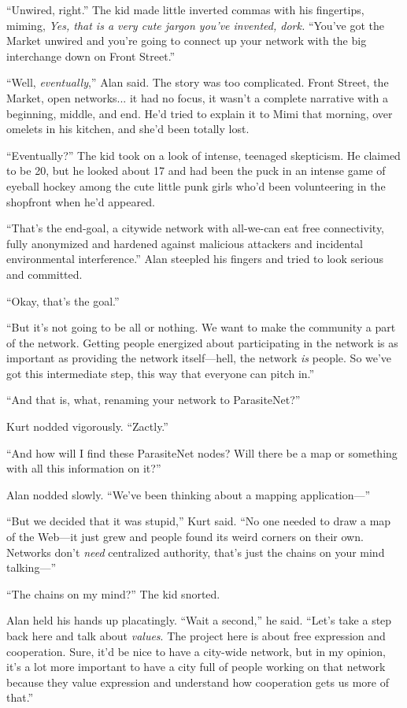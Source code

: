 \documentclass{article}
\begin{document}
``Unwired, right.'' The kid made little inverted commas with his
fingertips, miming, \textit{Yes, that is a very cute jargon you've
invented, dork.} ``You've got the Market unwired and you're going to
connect up your network with the big interchange down on Front
Street.''

``Well, \textit{eventually},'' Alan said.  The story was too
complicated.  Front Street, the Market, open networks...  it had no
focus, it wasn't a complete narrative with a beginning, middle, and
end.  He'd tried to explain it to Mimi that morning, over omelets in
his kitchen, and she'd been totally lost.

``Eventually?'' The kid took on a look of intense, teenaged
skepticism.  He claimed to be 20, but he looked about 17 and had been
the puck in an intense game of eyeball hockey among the cute little
punk girls who'd been volunteering in the shopfront when he'd
appeared.

``That's the end-goal, a citywide network with all-we-can eat free
connectivity, fully anonymized and hardened against malicious
attackers and incidental environmental interference.'' Alan steepled
his fingers and tried to look serious and committed.

``Okay, that's the goal.''

``But it's not going to be all or nothing.  We want to make the
community a part of the network.  Getting people energized about
participating in the network is as important as providing the network
itself---hell, the network \textit{is} people.  So we've got this
intermediate step, this way that everyone can pitch in.''

``And that is, what, renaming your network to ParasiteNet?''

Kurt nodded vigorously.  ``Zactly.''

``And how will I find these ParasiteNet nodes?  Will there be a map or
something with all this information on it?''

Alan nodded slowly.  ``We've been thinking about a mapping
application---''

``But we decided that it was stupid,'' Kurt said.  ``No one needed to
draw a map of the Web---it just grew and people found its weird
corners on their own.  Networks don't \textit{need} centralized
authority, that's just the chains on your mind talking---''

``The chains on my mind?'' The kid snorted.

Alan held his hands up placatingly.  ``Wait a second,'' he said. 
``Let's take a step back here and talk about \textit{values}.  The
project here is about free expression and cooperation.  Sure, it'd be
nice to have a city-wide network, but in my opinion, it's a lot more
important to have a city full of people working on that network
because they value expression and understand how cooperation gets us
more of that.''
\end{document}
